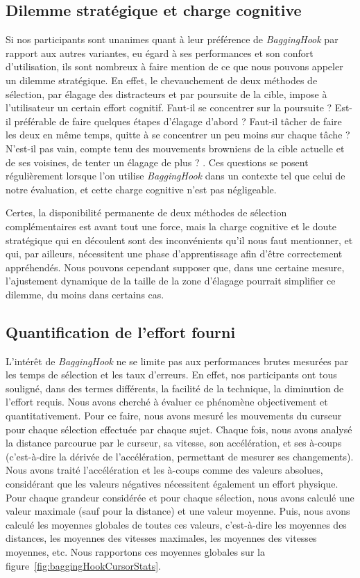 	\subsection{Dilemme stratégique et charge cognitive}
	Si nos participants sont unanimes quant à leur préférence de \emph{BaggingHook} par rapport aux autres variantes, eu égard à ses performances et son confort d'utilisation, ils sont nombreux à faire mention de ce que nous pouvons appeler un dilemme stratégique. En effet, le chevauchement de deux méthodes de sélection, par élagage des distracteurs et par poursuite de la cible, impose à l'utilisateur un certain effort cognitif. \og Faut-il se concentrer sur la poursuite ? Est-il préférable de faire quelques étapes d'élagage d'abord ? Faut-il tâcher de faire les deux en même temps, quitte à se concentrer un peu moins sur chaque tâche ? N'est-il pas vain, compte tenu des mouvements browniens de la cible actuelle et de ses voisines, de tenter un élagage de plus ? \fg{}. Ces questions se posent régulièrement lorsque l'on utilise \emph{BaggingHook} dans un contexte tel que celui de notre évaluation, et cette \og charge cognitive \fg{} n'est pas négligeable.
	
	Certes, la disponibilité permanente de deux méthodes de sélection complémentaires est avant tout une force, mais la charge cognitive et le doute stratégique qui en découlent sont des inconvénients qu'il nous faut mentionner, et qui, par ailleurs, nécessitent une phase d'apprentissage afin d'être correctement appréhendés. Nous pouvons cependant supposer que, dans une certaine mesure, l'ajustement dynamique de la taille de la zone d'élagage pourrait simplifier ce dilemme, du moins dans certains cas.
	
	\subsection{Quantification de l'effort fourni}
	L'intérêt de \emph{BaggingHook} ne se limite pas aux performances brutes mesurées par les temps de sélection et les taux d'erreurs. En effet, nos participants ont tous souligné, dans des termes différents, la \og facilité \fg{} de la technique, la diminution de l'effort requis. Nous avons cherché à évaluer ce phénomène objectivement et quantitativement. Pour ce faire, nous avons mesuré les mouvements du curseur pour chaque sélection effectuée par chaque sujet. Chaque fois, nous avons analysé la distance parcourue par le curseur, sa vitesse, son accélération, et ses à-coups (c'est-à-dire la dérivée de l'accélération, permettant de mesurer ses changements). Nous avons traité l'accélération et les à-coups comme des valeurs absolues, considérant que les valeurs négatives nécessitent également un effort physique. Pour chaque grandeur considérée et pour chaque sélection, nous avons calculé une valeur maximale (sauf pour la distance) et une valeur moyenne. Puis, nous avons calculé les moyennes globales de toutes ces valeurs, c'est-à-dire les moyennes des distances, les moyennes des vitesses maximales, les moyennes des vitesses moyennes, etc. Nous rapportons ces moyennes globales sur la figure~\ref{fig:baggingHookCursorStats}.


